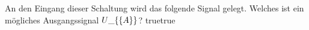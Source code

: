     {An den Eingang dieser Schaltung wird das folgende Signal gelegt. Welches ist ein mögliches Ausgangssignal $U\_\{\textrm\{A\}\}$?}
    {}
    {}
    {}
    {}
    {true}{true}